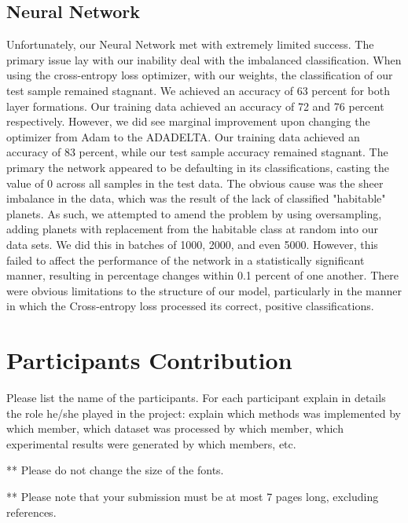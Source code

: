 \documentclass[11.5pt]{article}
\begin{document}
\subsection{Neural Network}
Unfortunately, our Neural Network met with extremely limited success. The primary issue lay with our inability deal with the imbalanced classification. When using the cross-entropy loss optimizer, with our weights, the classification of our test sample remained stagnant. We achieved an accuracy of 63 percent for both layer formations. Our training data achieved an accuracy of 72 and 76 percent respectively. However, we did see marginal improvement upon changing the optimizer from Adam to the ADADELTA. Our training data achieved an accuracy of 83 percent, while our test sample accuracy remained stagnant. The primary the network appeared to be defaulting in its classifications, casting the value of 0 across all samples in the test data. The obvious cause was the sheer imbalance in the data, which was the result of the lack of classified "habitable" planets. As such, we attempted to amend the problem by using oversampling, adding planets with replacement from the habitable class at random into our data sets. We did this in batches of 1000, 2000, and even 5000. However, this failed to affect the performance of the network in a statistically significant manner, resulting in percentage changes within 0.1 percent of one another. There were obvious limitations to the structure of our model, particularly in the manner in which the Cross-entropy loss processed its correct, positive classifications.  

\section{Participants Contribution}
Please list the name of the participants. For each participant explain in details the role he/she played in the project: explain which methods was implemented by which member, which dataset was processed by which member, which experimental results were generated by which members, etc.

\vspace{10mm}
** Please do not change the size of the fonts.

** Please note that your submission must be at most 7 pages long, excluding references.
\end{document}
